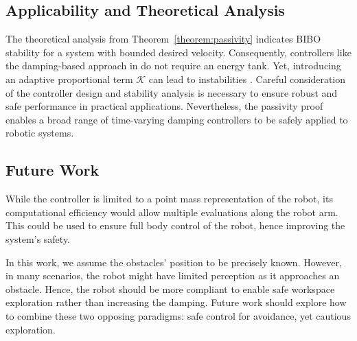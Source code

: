 \subsection{Applicability and Theoretical Analysis}
The theoretical analysis from Theorem~\ref{theorem:passivity} indicates BIBO stability for a system with bounded desired velocity. Consequently, controllers like the damping-based approach in \cite{kronander2015passive} do not require an energy tank. Yet, introducing an adaptive proportional term $\mathcal{K}$ can lead to instabilities \cite{ferraguti2013tank, kronander2016stability}. 
Careful consideration of the controller design and stability analysis is necessary to ensure robust and safe performance in practical applications. 
Nevertheless, the passivity proof enables a broad range of time-varying damping controllers to be safely applied to robotic systems.

\subsection{Future Work}
While the controller is limited to a point mass representation of the robot, its computational efficiency would allow multiple evaluations along the robot arm. This could be used to ensure full body control of the robot, hence improving the system's safety.

In this work, we assume the obstacles' position to be precisely known. However, in many scenarios, the robot might have limited perception as it approaches an obstacle. Hence, the robot should be more compliant to enable safe workspace exploration rather than increasing the damping. Future work should explore how to combine these two opposing paradigms: safe control for avoidance, yet cautious exploration.
